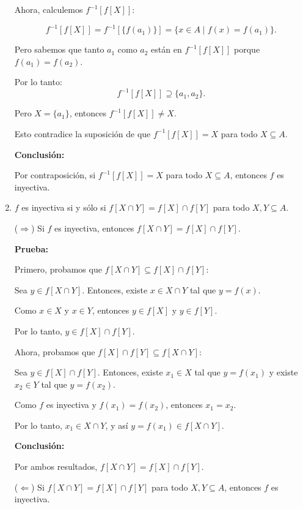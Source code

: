 \begin{solution}
\begin{enumerate}
    Ahora, calculemos \( f^{-1}[f[X]] \):
    
    \[f^{-1}[f[X]] = f^{-1}[\{ f(a_1) \}] = \{ x \in A \mid f(x) = f(a_1) \}.\]
    
    Pero sabemos que tanto \( a_1 \) como \( a_2 \) están en \( f^{-1}[f[X]] \) porque \( f(a_1) = f(a_2) \).
    
    Por lo tanto:
    \[f^{-1}[f[X]] \supseteq \{ a_1, a_2 \}.\]
    
    Pero \( X = \{ a_1 \} \), entonces \( f^{-1}[f[X]] \neq X \).
    
    Esto contradice la suposición de que \( f^{-1}[f[X]] = X \) para todo \( X \subseteq A \).
    
    \textbf{Conclusión:}
    
    Por contraposición, si \( f^{-1}[f[X]] = X \) para todo \( X \subseteq A \), entonces \( f \) es inyectiva.
    
    \item \( f \) es inyectiva si y sólo si \( f[X \cap Y] = f[X] \cap f[Y] \) para todo \( X, Y \subseteq A \).
    
    ($\Rightarrow$) Si \( f \) es inyectiva, entonces \( f[X \cap Y] = f[X] \cap f[Y] \).
    
    \textbf{Prueba:}
    
    Primero, probamos que \( f[X \cap Y] \subseteq f[X] \cap f[Y] \):
    
    Sea \( y \in f[X \cap Y] \). Entonces, existe \( x \in X \cap Y \) tal que \( y = f(x) \).
    
    Como \( x \in X \) y \( x \in Y \), entonces \( y \in f[X] \) y \( y \in f[Y] \).
    
    Por lo tanto, \( y \in f[X] \cap f[Y] \).
    
    Ahora, probamos que \( f[X] \cap f[Y] \subseteq f[X \cap Y] \):
    
    Sea \( y \in f[X] \cap f[Y] \). Entonces, existe \( x_1 \in X \) tal que \( y = f(x_1) \) y existe \( x_2 \in Y \) tal que \( y = f(x_2) \).
    
    Como \( f \) es inyectiva y \( f(x_1) = f(x_2) \), entonces \( x_1 = x_2 \).
    
    Por lo tanto, \( x_1 \in X \cap Y \), y así \( y = f(x_1) \in f[X \cap Y] \).
    
    \textbf{Conclusión:}
    
      Por ambos resultados, \( f[X \cap Y] = f[X] \cap f[Y] \).
    
    ($\Leftarrow$) Si \( f[X \cap Y] = f[X] \cap f[Y] \) para todo \( X, Y \subseteq A \), entonces \( f \) es inyectiva.
    

\end{enumerate}
\end{solution}
